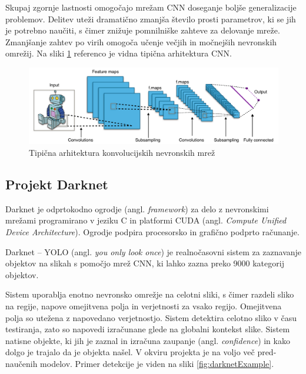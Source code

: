\documentclass[runningheads,a4paper]{llncs}
\begin{document}
Skupaj zgornje lastnosti omogočajo mrežam CNN doseganje boljše generalizacije problemov. Delitev uteži dramatično zmanjša število prosti parametrov, ki se jih je potrebno naučiti, s čimer znižuje pomnilniške zahteve za delovanje mreže. Zmanjšanje zahtev po virih omogoča učenje večjih in močnejših nevronskih omrežij. Na sliki \ref{fig:archCNN} referenco je vidna tipična arhitektura CNN.

\begin{figure}[H]
\centering
\includegraphics[width=120mm]{figures/Typical_cnn.png}
\caption{Tipična arhitektura konvolucijskih nevronskih mrež}
\label{fig:archCNN}
\end{figure}

\subsection{Projekt Darknet}
Darknet je odprtokodno ogrodje (angl. \textit{framework}) za delo z nevronskimi mrežami programirano v jeziku C in platformi CUDA (angl. \textit{Compute Unified Device Architecture})\cite{darknet13}. Ogrodje podpira procesorsko in grafično podprto računanje.

Darknet – YOLO (angl. \textit{you only look once}) je realnočasovni sistem za zaznavanje objektov na slikah s pomočjo mrež CNN, ki lahko zazna preko 9000 kategorij objektov. 

Sistem uporablja enotno nevronsko omrežje na celotni sliki, s čimer razdeli sliko na regije, napove omejitvena polja in verjetnosti za vsako regijo. Omejitvena polja so utežena z napovedano verjetnostjo. Sistem detektira celotno sliko v času testiranja, zato so napovedi izračunane glede na globalni kontekst slike. Sistem natisne objekte, ki jih je zaznal in izračuna zaupanje (angl. \textit{confidence}) in kako dolgo je trajalo da je objekta našel. V okviru projekta je na voljo več pred-naučenih modelov.  Primer detekcije je viden na sliki \ref{fig:darknetExample}.
\end{document}
